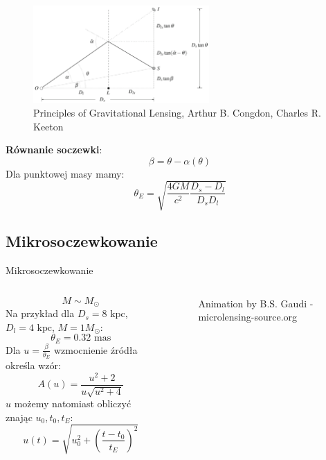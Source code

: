\documentclass{beamer}
\begin{document}
\begin{frame}
    \begin{figure}
        \centering
        \includegraphics[width=0.6\textwidth]{Screenshot from 2024-06-10 13-41-41.png}
        \caption*{\tiny{Principles of Gravitational
                Lensing, Arthur B. Congdon, Charles R. Keeton}}
    \end{figure}
    \textbf{Równanie soczewki}:
    \[\beta = \theta - \alpha(\theta)\]
    Dla punktowej masy mamy:
    \[\theta_E = \sqrt{\frac{4GM}{c^2}\frac{D_s-D_l}{D_s D_l}}\]
\end{frame}

\subsection{Mikrosoczewkowanie}
\begin{frame}{Mikrosoczewkowanie}
    \begin{columns}
        \begin{column}{0.6\linewidth}
            \[M \sim M_{\odot}\]
            Na przykład dla $D_s = 8 \text{ kpc}$, $D_l = 4 \text{ kpc}$, $M = 1 M_{\odot}$:
            \[\theta_E = 0.32 \text{ mas}\]
            Dla $u = \frac{\beta}{\theta_E}$ wzmocnienie źródła określa wzór:
            \[A(u) = \frac{u^2 + 2}{u \sqrt{u^2 + 4}}\]
            $u$ możemy natomiast obliczyć znając $u_0, t_0, t_E$:
            \[u(t) = \sqrt{u_0^2 + \left(\frac{t-t_0}{t_E}\right)^2}\]
        \end{column}
        \begin{column}{0.4\linewidth}
            \begin{figure}
                \centering
                \caption*{\tiny{Animation by B.S. Gaudi - microlensing-source.org}}
            \end{figure}
        \end{column}
    \end{columns}

\end{frame}
\end{document}
